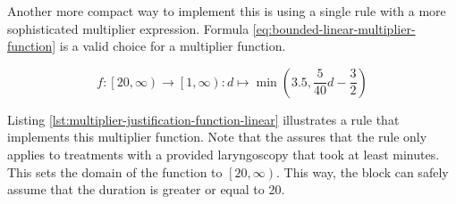 \begin{center}
    \label{plot:multiplier-justification-step-function}
\end{center}

Another more compact way to implement this is using a single rule with a more sophisticated multiplier expression.
Formula \ref{eq:bounded-linear-multiplier-function} is a valid choice for a multiplier function.

\begin{equation}
    \label{eq:bounded-linear-multiplier-function}
    f: \left[20, \infty\right) \rightarrow \left[ 1, \infty \right) : d \mapsto \min\left( 3.5, \frac{5}{40} d - \frac{3}{2} \right)
\end{equation}

Listing \ref{lst:multiplier-justification-function-linear} illustrates a rule that implements this multiplier function.
Note that the  assures that the rule only applies to treatments with a provided laryngoscopy that took at least  minutes.
This sets the domain of the function to $\left[20, \infty\right)$.
This way, the  block can safely assume that the duration is greater or equal to 20.




\begin{center}
\end{center}

